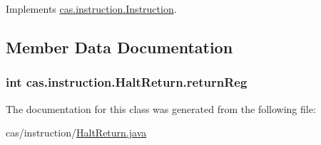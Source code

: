 Implements \hyperlink{classcas_1_1instruction_1_1_instruction_a7992edd8d79e1a4e82fb44f4c9abacf9}{cas.\-instruction.\-Instruction}.



\subsection{Member Data Documentation}
\hypertarget{classcas_1_1instruction_1_1_halt_return_afd0e3bf0dd3d52b6a0982a9de9aa55d1}{
\subsubsection[{return\-Reg}]{\setlength{\rightskip}{0pt plus 5cm}int cas.\-instruction.\-Halt\-Return.\-return\-Reg\hspace{0.3cm}{\ttfamily [protected]}}}\label{classcas_1_1instruction_1_1_halt_return_afd0e3bf0dd3d52b6a0982a9de9aa55d1}


The documentation for this class was generated from the following file\-:\begin{DoxyCompactItemize}
\item 
cas/instruction/\hyperlink{_halt_return_8java}{Halt\-Return.\-java}\end{DoxyCompactItemize}
